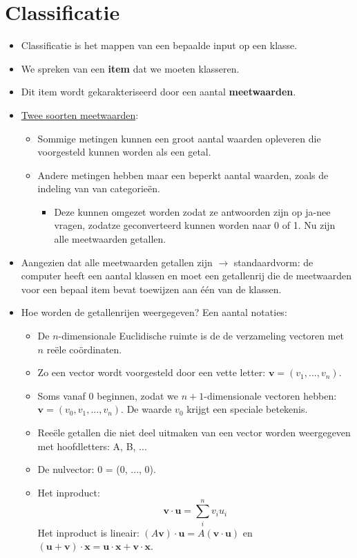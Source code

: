 \section{Classificatie}
\begin{itemize}
	\item Classificatie is het mappen van een bepaalde input op een klasse.
	\item We spreken van een \textbf{item} dat we moeten klasseren.
	\item Dit item wordt gekarakteriseerd door een aantal \textbf{meetwaarden}.
	\item \underline{Twee soorten meetwaarden}:
	\begin{itemize}
		\item Sommige metingen kunnen een groot aantal waarden opleveren die voorgesteld kunnen worden als een getal.
		\item Andere metingen hebben maar een beperkt aantal waarden, zoals de indeling van van categorieën. 
		\begin{itemize}
			\item Deze kunnen omgezet worden zodat ze antwoorden zijn op ja-nee vragen, zodatze geconverteerd kunnen worden naar 0 of 1.
			\good Nu zijn alle meetwaarden getallen.	
		\end{itemize}
	\end{itemize}
	\item Aangezien dat alle meetwaarden getallen zijn $\rightarrow$ standaardvorm: de computer heeft een aantal klassen en moet een getallenrij die de meetwaarden voor een bepaal item bevat toewijzen aan één van de klassen.
	\item Hoe worden de getallenrijen weergegeven? Een aantal notaties:
	\begin{itemize}
		\item De $n$-dimensionale Euclidische ruimte is de de verzameling vectoren met $n$ reële coördinaten.
		\item Zo een vector wordt voorgesteld door een vette letter: $\textbf{v} = (v_1, ..., v_n)$.
		\item Soms vanaf 0 beginnen, zodat we $n+1$-dimensionale vectoren hebben: $\textbf{v} = (v_0, v_1, ..., v_n)$. De waarde $v_0$ krijgt een speciale betekenis.
		\item Reeële getallen die niet deel uitmaken van een vector worden weergegeven met hoofdletters: A, B, ...
		\item De nulvector: 0 = (0, ..., 0).
		\item Het inproduct:
		$$\textbf{v}\cdot\textbf{u} = \sum_{i}^{n}v_iu_i$$
		Het inproduct is lineair: $(A\textbf{v})\cdot \textbf{u} = A(\textbf{v}\cdot\textbf{u})$ en $(\textbf{u} + \textbf{v})\cdot\textbf{x} = \textbf{u} \cdot \textbf{x} + \textbf{v} \cdot \textbf{x}$.
		

\end{itemize}
\end{itemize}
